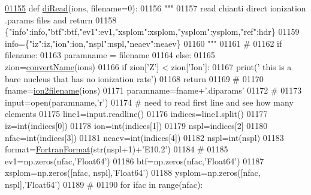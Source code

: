 \begin{DoxyCode}
\hypertarget{namespacepyneb_1_1utils_1_1__chianti__tools_l01155}{}\hyperlink{namespacepyneb_1_1utils_1_1__chianti__tools_a28552b5d18a1b604ed4512c435e648bc}{01155} \textcolor{keyword}{def }\hyperlink{namespacepyneb_1_1utils_1_1__chianti__tools_a28552b5d18a1b604ed4512c435e648bc}{diRead}(ions, filename=0):
01156     \textcolor{stringliteral}{"""}
01157 \textcolor{stringliteral}{    read chianti direct ionization .params files and return}
01158 \textcolor{stringliteral}{        \{"info":info,"btf":btf,"ev1":ev1,"xsplom":xsplom,"ysplom":ysplom,"ref":hdr\}}
01159 \textcolor{stringliteral}{        info=\{"iz":iz,"ion":ion,"nspl":nspl,"neaev":neaev\}}
01160 \textcolor{stringliteral}{    """}
01161     \textcolor{comment}{#}
01162     \textcolor{keywordflow}{if} filename:
01163         paramname = filename
01164     \textcolor{keywordflow}{else}:
01165         zion=\hyperlink{namespacepyneb_1_1utils_1_1__chianti__tools_a92cf299ad3407ee8923739e2761ab13f}{convertName}(ions)
01166         \textcolor{keywordflow}{if} zion[\textcolor{stringliteral}{'Z'}] < zion[\textcolor{stringliteral}{'Ion'}]:
01167             print(\textcolor{stringliteral}{' this is a bare nucleus that has no ionization rate'})
01168             \textcolor{keywordflow}{return}
01169         \textcolor{comment}{#}
01170         fname=\hyperlink{namespacepyneb_1_1utils_1_1__chianti__tools_ad4bc7b577fd4c3819ceb00b0a444351b}{ion2filename}(ions)
01171         paramname=fname+\textcolor{stringliteral}{'.diparams'}
01172     \textcolor{comment}{#}
01173     input=open(paramname,\textcolor{stringliteral}{'}\textcolor{stringliteral}{r')}
01174 \textcolor{stringliteral}{    }\textcolor{comment}{#  need to read first line and see how many elements}
01175     line1=input.readline()
01176     indices=line1.split()
01177     iz=int(indices[0])
01178     ion=int(indices[1])
01179     nspl=indices[2]
01180     nfac=int(indices[3])
01181     neaev=int(indices[4])
01182     nspl=int(nspl)
01183     format=\hyperlink{classpyneb_1_1utils_1_1_fortran_format_1_1_fortran_format}{FortranFormat}(str(nspl+1)+\textcolor{stringliteral}{'E10.2'})
01184     \textcolor{comment}{#}
01185     ev1=np.zeros(nfac,\textcolor{stringliteral}{'Float64'})
01186     btf=np.zeros(nfac,\textcolor{stringliteral}{'Float64'})
01187     xsplom=np.zeros([nfac, nspl],\textcolor{stringliteral}{'Float64'})
01188     ysplom=np.zeros([nfac, nspl],\textcolor{stringliteral}{'Float64'})
01189     \textcolor{comment}{#}
01190     \textcolor{keywordflow}{for} ifac \textcolor{keywordflow}{in} range(nfac):

\end{DoxyCode}
